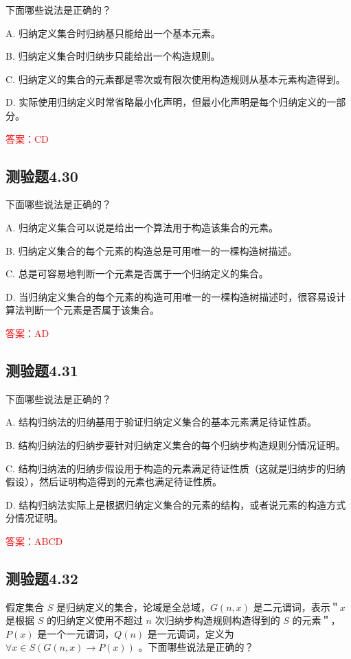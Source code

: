 \documentclass[UTF8, heading=true]{ctexart}
\begin{document}
下面哪些说法是正确的？

A. 归纳定义集合时归纳基只能给出一个基本元素。

B. 归纳定义集合时归纳步只能给出一个构造规则。

C. 归纳定义的集合的元素都是零次或有限次使用构造规则从基本元素构造得到。

D. 实际使用归纳定义时常省略最小化声明，但最小化声明是每个归纳定义的一部分。

\textcolor{red}{答案：CD}

\subsection{测验题4.30}

下面哪些说法是正确的？

A. 归纳定义集合可以说是给出一个算法用于构造该集合的元素。

B. 归纳定义集合的每个元素的构造总是可用唯一的一棵构造树描述。

C. 总是可容易地判断一个元素是否属于一个归纳定义的集合。

D. 当归纳定义集合的每个元素的构造可用唯一的一棵构造树描述时，很容易设计算法判断一个元素是否属于该集合。

\textcolor{red}{答案：AD}

\subsection{测验题4.31}

下面哪些说法是正确的？

A. 
结构归纳法的归纳基用于验证归纳定义集合的基本元素满足待证性质。

B. 
结构归纳法的归纳步要针对归纳定义集合的每个归纳步构造规则分情况证明。

C. 
结构归纳法的归纳步假设用于构造的元素满足待证性质（这就是归纳步的归纳假设），然后证明构造得到的元素也满足待证性质。

D. 
结构归纳法实际上是根据归纳定义集合的元素的结构，或者说元素的构造方式分情况证明。

\textcolor{red}{答案：ABCD}

\subsection{测验题4.32}

假定集合 $S$ 是归纳定义的集合，论域是全总域，$G(n, x)$ 是二元谓词，表示＂$x$ 是根据 $S$ 的归纳定义使用不超过 $n$ 次归纳步构造规则构造得到的 $S$ 的元素＂，$P(x)$ 是一个一元谓词，$Q(n)$ 是一元调词，定义为 $\forall x \in S(G(n, x) \rightarrow P(x))$ 。下面哪些说法是正确的？
\end{document}
